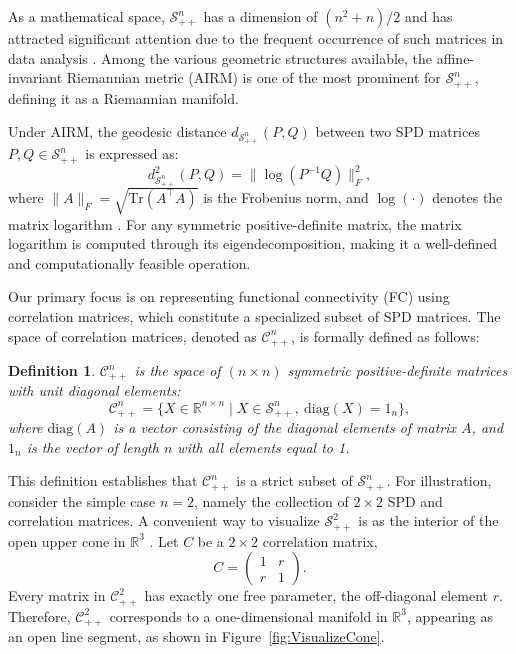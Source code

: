 \documentclass[10pt]{article}
\newtheorem{definition}{Definition}
\newcommand{\SPD}{\mathcal{S}_{++}^n}
\newcommand{\CORR}{\mathcal{C}_{++}^n}
\begin{document}
As a mathematical space, $\SPD$ has a dimension of $(n^2+n)/2$ and has attracted significant attention due to the frequent occurrence of such matrices in data analysis \citep{bhatia_2009_PositiveDefiniteMatrices}. Among the various geometric structures available, the affine-invariant Riemannian metric (AIRM) \citep{pennec_2006_IntrinsicStatisticsRiemannian} is one of the most prominent for $\SPD$, defining it as a Riemannian manifold. 

Under AIRM, the geodesic distance $d_{\SPD}(P, Q)$ between two SPD matrices $P, Q \in \SPD$ is expressed as: 
\begin{equation*} 
	d_{\SPD}^2(P, Q) = \| \log(P^{-1}Q) \|_F^2, 
\end{equation*} 
where $\|A \|_F = \sqrt{\text{Tr}(A^\top A)}$ is the Frobenius norm, and $\log(\cdot)$ denotes the matrix logarithm \citep{hall_2015_LieGroupsLie}. For any symmetric positive-definite matrix, the matrix logarithm is computed through its eigendecomposition, making it a well-defined and computationally feasible operation.


Our primary focus is on representing functional connectivity (FC) using correlation matrices, which constitute a specialized subset of SPD matrices. The space of correlation matrices, denoted as $\CORR$, is formally defined as follows:

\begin{definition} 
	$\CORR$ is the space of $(n \times n)$ symmetric positive-definite matrices with unit diagonal elements: 
	\begin{equation*} 
		\CORR = \lbrace X \in \mathbb{R}^{n \times n} \mid X \in \SPD,~ \text{diag}(X) = 1_n \rbrace, 
	\end{equation*} 
	where $\text{diag}(A)$ is a vector consisting of the diagonal elements of matrix $A$, and $1_n$ is the vector of length $n$ with all elements equal to 1. 
\end{definition}


This definition establishes that $\CORR$ is a strict subset of $\SPD$. For illustration, consider the simple case $n=2$, namely the collection of $2\times 2$ SPD and correlation matrices. A convenient way to visualize $\mathcal{S}_{++}^2$ is as the interior of the open upper cone in $\mathbb{R}^3$ \citep{bhatia_2009_PositiveDefiniteMatrices}. Let $C$ be a $2\times 2$ correlation matrix,
\begin{equation*}
	C = \begin{pmatrix}
		1 & r \\ r & 1
	\end{pmatrix}.
\end{equation*}
Every matrix in $\mathcal{C}_{++}^2$ has exactly one free parameter, the off-diagonal element $r$. Therefore, $\mathcal{C}_{++}^2$ corresponds to a one-dimensional manifold in $\mathbb{R}^3$, appearing as an open line segment, as shown in Figure~\ref{fig:VisualizeCone}. 
\end{document}
